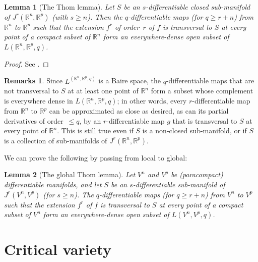 \documentclass{article}
\theoremstyle{plain}
\newtheorem*{lemma*}{Lemma}
\theoremstyle{definition}
\newtheorem*{remarks*}{Remarks}
\newcommand{\RR}{\mathbb{R}}
\renewcommand{\geq}{\geqslant}
\renewcommand{\leq}{\leqslant}
\newcommand{\oldpage}[1]{\marginpar{\footnotesize$\Big\vert$ \textit{p.~#1}}}
\begin{document}
\begin{lemma*}[The Thom lemma]
  Let $S$ be an $s$-differentiable closed sub-manifold of $J^r(\RR^n,\RR^p)$ (with $s\geq n$).
  Then the $q$-differentiable maps (for $q\geq r+n$) from $\RR^n$
\oldpage{7-04}
  to $\RR^p$ such that the extension $f^r$ of order~$r$ of $f$ is transversal to $S$ at every point of a compact subset of $\RR^n$ form an everywhere-dense open subset of $L(\RR^n,\RR^p,q)$.
\end{lemma*}

\begin{proof}
  See \cite{3}.
\end{proof}

\begin{remarks*}
  Since $L^(\RR^n,\RR^p,q)$ is a Baire space, the $q$-differentiable maps that are not transversal to $S$ at at least one point of $\RR^n$ form a subset whose complement is everywhere dense in $L(\RR^n,\RR^p,q)$;
  in other words, every $r$-differentiable map from $\RR^n$ to $\RR^p$ can be approximated as close as desired, as can its partial derivatives of order~$\leq q$, by an $r$-differentiable map $g$ that is transversal to $S$ at every point of $\RR^n$.
  This is still true even if $S$ is a non-closed sub-manifold, or if $S$ is a collection of sub-manifolds of $J^r(\RR^n,\RR^p)$.
\end{remarks*}

We can prove the following by passing from local to global:

\begin{lemma*}[The global Thom lemma]
  Let $V^n$ and $V^p$ be (paracompact) differentiable manifolds, and let $S$ be an $s$-differentiable sub-manifold of $J^r(V^n,V^p)$ (for $s\geq n$).
  The $q$-differentiable maps (for $q\geq r+n$) from $V^n$ to $V^p$ such that the extension $f^r$ of $f$ is transversal to $S$ at every point of a compact subset of $V^n$ form an everywhere-dense open subset of $L(V^n,V^p,q)$.
\end{lemma*}


\section{Critical variety}
\label{3}





\nocite{*}
\end{document}
